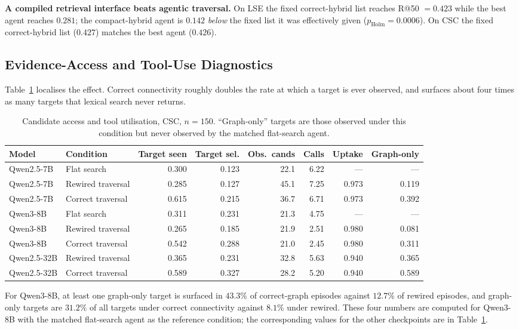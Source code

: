 \textbf{A compiled retrieval interface beats agentic traversal.} On LSE the fixed correct-hybrid
list reaches R@50 $=0.423$ while the best agent reaches $0.281$; the compact-hybrid agent is
$0.142$ \emph{below} the fixed list it was effectively given ($p_{\text{Holm}}=0.0006$). On CSC the
fixed correct-hybrid list ($0.427$) matches the best agent ($0.426$).

\subsection{Evidence-Access and Tool-Use Diagnostics}
\label{appendix:ar-diagnostics}

Table~\ref{tab:ar-access} localises the effect. Correct connectivity roughly doubles the rate at
which a target is ever observed, and surfaces about four times as many targets that lexical search
never returns.

\begin{table}[t]
\centering
\small
\caption{Candidate access and tool utilisation, CSC, $n{=}150$. ``Graph-only'' targets are those
observed under this condition but never observed by the matched flat-search agent.}
\label{tab:ar-access}
\begin{tabular}{llrrrrrr}
\toprule
Model & Condition & Target seen & Target sel. & Obs.\ cands & Calls & Uptake & Graph-only \\
\midrule
Qwen2.5-7B & Flat search & 0.300 & 0.123 & 22.1 & 6.22 & --- & --- \\
Qwen2.5-7B & Rewired traversal & 0.285 & 0.127 & 45.1 & 7.25 & 0.973 & 0.119 \\
Qwen2.5-7B & Correct traversal & 0.615 & 0.215 & 36.7 & 6.71 & 0.973 & 0.392 \\
\addlinespace
Qwen3-8B & Flat search & 0.311 & 0.231 & 21.3 & 4.75 & --- & --- \\
Qwen3-8B & Rewired traversal & 0.265 & 0.185 & 21.9 & 2.51 & 0.980 & 0.081 \\
Qwen3-8B & Correct traversal & 0.542 & 0.288 & 21.0 & 2.45 & 0.980 & 0.311 \\
\addlinespace
Qwen2.5-32B & Rewired traversal & 0.365 & 0.231 & 32.8 & 5.63 & 0.940 & 0.365 \\
Qwen2.5-32B & Correct traversal & 0.589 & 0.327 & 28.2 & 5.20 & 0.940 & 0.589 \\
\bottomrule
\end{tabular}
\end{table}

For Qwen3-8B, at least one graph-only target is surfaced in $43.3\%$ of correct-graph episodes
against $12.7\%$ of rewired episodes, and graph-only targets are $31.2\%$ of all targets under
correct connectivity against $8.1\%$ under rewired. These four numbers are computed for Qwen3-8B
with the matched flat-search agent as the reference condition; the corresponding values for the
other checkpoints are in Table~\ref{tab:ar-access}.

